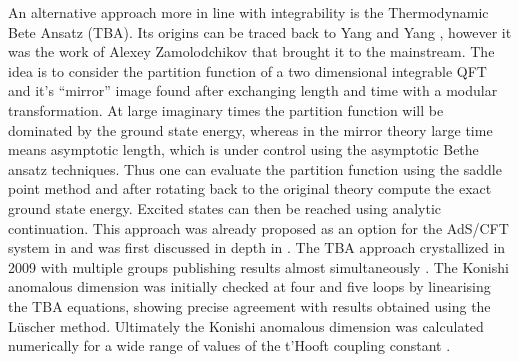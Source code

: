 An alternative approach more in line with integrability is the Thermodynamic Bete Ansatz (TBA).
Its origins can be traced back to Yang and Yang \cite{Yang}, however it was the work of Alexey Zamolodchikov \cite{Zamolodchikov1, Zamolodchikov2} that brought it to the mainstream. 
The idea is to consider the partition function of a two dimensional integrable QFT and it's ``mirror'' image found after exchanging length and time with a modular transformation.
At large imaginary times the partition function will be dominated by the ground state energy, whereas in the mirror theory large time means asymptotic length, which is under control using the asymptotic Bethe ansatz techniques.
Thus one can evaluate the partition function using the saddle point method and after rotating back to the original theory compute the exact ground state energy. 
Excited states can then be reached using analytic continuation. 
This approach was already proposed as an option for the AdS/CFT system in \cite{Ambjorn:2005wa} and was first discussed in depth in \cite{Arutyunov:2007tc}.
The TBA approach crystallized in 2009 with multiple groups publishing results almost simultaneously \cite{Gromov:2009tv, Bombardelli:2009ns, Gromov:2009bc, Arutyunov:2009ur}.
The Konishi anomalous dimension was initially checked at four \cite{Gromov:2009bc} and five \cite{Arutyunov:2010gb, Balog:2010xa} loops by linearising the TBA equations, showing precise agreement with results obtained using the L\"{u}scher method.
Ultimately the Konishi anomalous dimension was calculated numerically for a wide range of values of the t'Hooft coupling constant \cite{Gromov:2009zb}.

